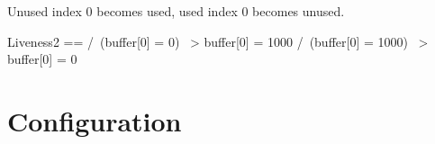 Unused index 0 becomes used, used index 0 becomes unused.
\begin{tla}
    Liveness2 ==
    /\ (buffer[0] = 0) ~> buffer[0] = 1000
    /\ (buffer[0] = 1000) ~> buffer[0] = 0
\end{tla}
\begin{tlatex}
%
\end{tlatex}

\section{Configuration}

% 
